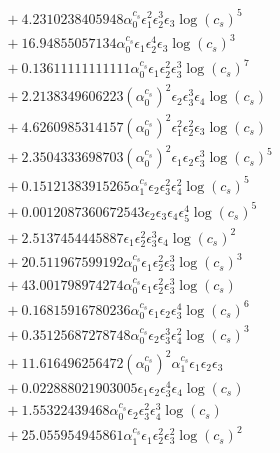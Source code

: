 \documentclass[10pt]{article}
\begin{document}
\begin{align*}
&{}  + 4.2310238405948 \alpha_{0}^{c_s} \epsilon_{1}^{2} \epsilon_{2}^{3} \epsilon_{3} \log{\left(c_{s} \right)}^{5} \\
&{}  + 16.94855057134 \alpha_{0}^{c_s} \epsilon_{1} \epsilon_{2}^{4} \epsilon_{3} \log{\left(c_{s} \right)}^{3} \\
&{}  + 0.13611111111111 \alpha_{0}^{c_s} \epsilon_{1} \epsilon_{2}^{2} \epsilon_{3}^{3} \log{\left(c_{s} \right)}^{7} \\
&{}  + 2.2138349606223 \left(\alpha_{0}^{c_s}\right)^{2} \epsilon_{2} \epsilon_{3}^{3} \epsilon_{4} \log{\left(c_{s} \right)} \\
&{}  + 4.6260985314157 \left(\alpha_{0}^{c_s}\right)^{2} \epsilon_{1}^{2} \epsilon_{2}^{2} \epsilon_{3} \log{\left(c_{s} \right)} \\
&{}  + 2.3504333698703 \left(\alpha_{0}^{c_s}\right)^{2} \epsilon_{1} \epsilon_{2} \epsilon_{3}^{3} \log{\left(c_{s} \right)}^{5} \\
&{}  + 0.15121383915265 \alpha_{1}^{c_s} \epsilon_{2} \epsilon_{3}^{2} \epsilon_{4}^{2} \log{\left(c_{s} \right)}^{5} \\
&{}  + 0.0012087360672543 \epsilon_{2} \epsilon_{3} \epsilon_{4} \epsilon_{5}^{4} \log{\left(c_{s} \right)}^{5} \\
&{}  + 2.5137454445887 \epsilon_{1} \epsilon_{2}^{2} \epsilon_{3}^{3} \epsilon_{4} \log{\left(c_{s} \right)}^{2} \\
&{}  + 20.511967599192 \alpha_{0}^{c_s} \epsilon_{1} \epsilon_{2}^{2} \epsilon_{3}^{3} \log{\left(c_{s} \right)}^{3} \\
&{}  + 43.001798974274 \alpha_{0}^{c_s} \epsilon_{1} \epsilon_{2}^{2} \epsilon_{3}^{3} \log{\left(c_{s} \right)} \\
&{}  + 0.16815916780236 \alpha_{0}^{c_s} \epsilon_{1} \epsilon_{2} \epsilon_{3}^{4} \log{\left(c_{s} \right)}^{6} \\
&{}  + 0.35125687278748 \alpha_{0}^{c_s} \epsilon_{2} \epsilon_{3}^{3} \epsilon_{4}^{2} \log{\left(c_{s} \right)}^{3} \\
&{}  + 11.616496256472 \left(\alpha_{0}^{c_s}\right)^{2} \alpha_{1}^{c_s} \epsilon_{1} \epsilon_{2} \epsilon_{3} \\
&{}  + 0.022888021903005 \epsilon_{1} \epsilon_{2} \epsilon_{3}^{4} \epsilon_{4} \log{\left(c_{s} \right)} \\
&{}  + 1.55322439468 \alpha_{0}^{c_s} \epsilon_{2} \epsilon_{3}^{2} \epsilon_{4}^{3} \log{\left(c_{s} \right)} \\
&{}  + 25.055954945861 \alpha_{1}^{c_s} \epsilon_{1} \epsilon_{2}^{2} \epsilon_{3}^{2} \log{\left(c_{s} \right)}^{2} \\

\end{align*}
\end{document}
